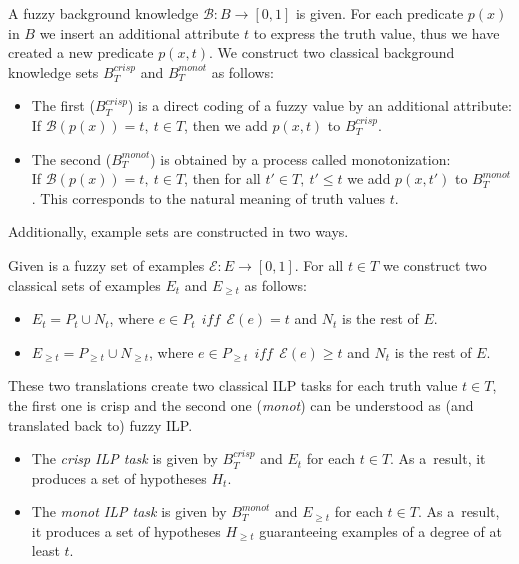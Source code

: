 \begin{definition}
A fuzzy background knowledge ${\mathcal B}:B\longrightarrow [0,1]$ is given. For each predicate $p(x)$ in $B$ we insert an additional attribute $t$ to express the truth value, thus we have created a new predicate $p(x,t)$. We construct two classical background knowledge sets $B^{crisp}_T$ and $B^{monot}_T$  as follows:

\begin{itemize}
	\item The first ($B^{crisp}_T$) is a direct coding of a fuzzy value by an additional attribute:
\\If ${\mathcal B}(p(x))=t,\  t \in T$, then we add $p(x,t)$ to  ${B}^{crisp}_T$.
	\item The second ($B^{monot}_T$) is obtained by a process called monotonization:
\\If ${\mathcal B}(p(x))=t,\  t \in T$, then for all $t'\in T,\  t'\le t$ we add $p(x,t')$ to ${B}^{monot}_T$.
This corresponds to the natural meaning of truth values $t$.
\end{itemize}
\end{definition}



Additionally, example sets are constructed in two ways.
\begin{definition}
Given is a fuzzy set of examples ${\mathcal E}:E\longrightarrow [0,1]$. For all $t\in T$ we construct two classical sets of examples $E_t$ and $E_{\ge t}$  as follows:
\begin{itemize}
	\item $E_t=P_t\cup N_t$, where 
$e\in P_t \ \ iff \ \ {\mathcal E}(e)= t$
and $N_t$ is the rest of $E$.
	\item $E_{\ge t}=P_{\ge t}\cup N_{\ge t}$, where 
$e\in P_{\ge t} \ \ iff \ \ {\mathcal E}(e)\ge t$
and $N_t$ is the rest of $E$.
\end{itemize}
\end{definition}



These two translations create two classical ILP tasks for each truth value $t\in T$, the first one is crisp and the second one (\emph{monot}) can be understood as (and translated back to) fuzzy ILP.

\begin{itemize}
	\item The \textit{crisp ILP task} is given by $B^{crisp}_{T}$ and $E_t$ for each $t\in T$.  As a~result, it produces a set of hypotheses $H_t$.

	\item The \textit{monot ILP task} is given by ${B}^{monot}_T$ and $E_{\ge t}$ for each $t\in T$. As a~result, it produces a set of hypotheses $H_{\ge t}$ guaranteeing examples of a degree of at least $t$.
\end{itemize}

